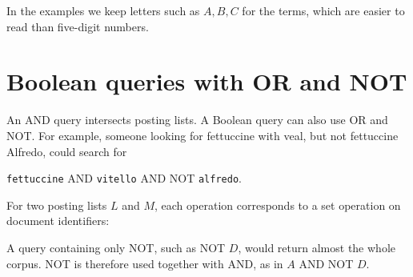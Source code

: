 \documentclass[a4paper,12pt,oneside]{report}
\begin{document}
In the examples we keep letters such as $A,B,C$ for the terms, which
are easier to read than five-digit numbers.

\section{Boolean queries with OR and NOT}

An AND query intersects posting lists. A Boolean query can also use
OR and NOT. For example, someone looking for fettuccine with veal,
but not fettuccine Alfredo, could search for
\begin{center}
  \texttt{fettuccine} AND \texttt{vitello} AND NOT \texttt{alfredo}.
\end{center}
For two posting lists $L$ and $M$, each operation corresponds to a
set operation on document identifiers:
\begin{center}
\end{center}
A query containing only NOT, such as NOT $D$, would return almost the
whole corpus. NOT is therefore used together with AND, as in
$A$ AND NOT $D$.
\end{document}
